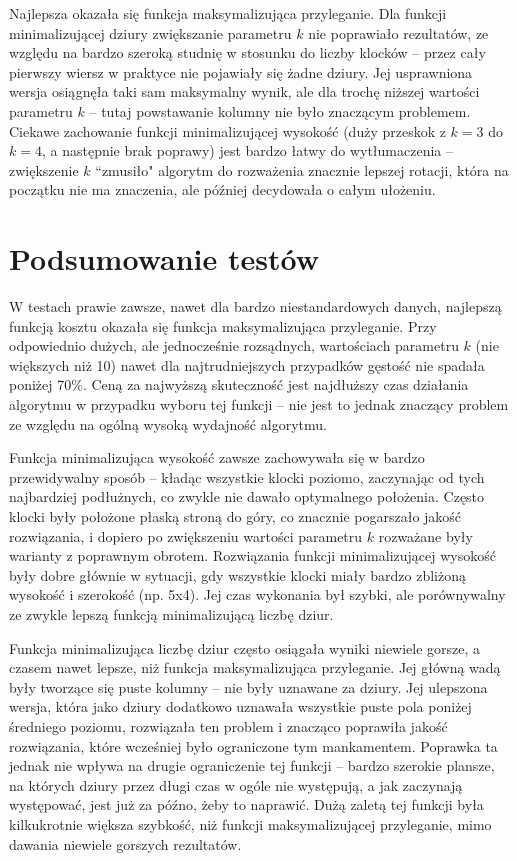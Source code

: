 \documentclass{article}
\begin{document}
Najlepsza okazała się funkcja maksymalizująca przyleganie. Dla funkcji minimalizującej dziury zwiększanie parametru $k$ nie poprawiało rezultatów, ze względu na bardzo szeroką studnię w stosunku do liczby klocków -- przez cały pierwszy wiersz w praktyce nie pojawiały się żadne dziury. Jej usprawniona wersja osiągnęła taki sam maksymalny wynik, ale dla trochę niższej wartości parametru $k$ -- tutaj powstawanie kolumny nie było znaczącym problemem.
Ciekawe zachowanie funkcji minimalizującej wysokość (duży przeskok z $k=3$ do $k=4$, a następnie brak poprawy) jest bardzo łatwy do wytłumaczenia -- zwiększenie $k$ ``zmusiło" algorytm do rozważenia znacznie lepszej rotacji, która na początku nie ma znaczenia, ale później decydowała o całym ułożeniu. 


\clearpage

\section{Podsumowanie testów} 
W testach prawie zawsze, nawet dla bardzo niestandardowych danych, najlepszą funkcją kosztu okazała się funkcja maksymalizująca przyleganie. Przy odpowiednio dużych, ale jednocześnie rozsądnych, wartościach parametru $k$ (nie większych niż 10) nawet dla najtrudniejszych przypadków gęstość nie spadała poniżej 70\%. Ceną za najwyższą skuteczność jest najdłuższy czas działania algorytmu w przypadku wyboru tej funkcji -- nie jest to jednak znaczący problem ze względu na ogólną wysoką wydajność algorytmu.

Funkcja minimalizująca wysokość zawsze zachowywała się w bardzo przewidywalny sposób -- kładąc wszystkie klocki poziomo, zaczynając od tych najbardziej podłużnych, co zwykle nie dawało optymalnego położenia. Często klocki były położone płaską stroną do góry, co znacznie pogarszało jakość rozwiązania, i dopiero po zwiększeniu wartości parametru $k$ rozważane były warianty z poprawnym obrotem. Rozwiązania funkcji minimalizującej wysokość były dobre głównie w sytuacji, gdy wszystkie klocki miały bardzo zbliżoną wysokość i szerokość (np. 5x4). Jej czas wykonania był szybki, ale porównywalny ze zwykle lepszą funkcją minimalizującą liczbę dziur.

Funkcja minimalizująca liczbę dziur często osiągała wyniki niewiele gorsze, a czasem nawet lepsze, niż funkcja maksymalizująca przyleganie. Jej główną wadą były tworzące się puste kolumny -- nie były uznawane za dziury. Jej ulepszona wersja, która jako dziury dodatkowo uznawała wszystkie puste pola poniżej średniego poziomu, rozwiązała ten problem i znacząco poprawiła jakość rozwiązania, które wcześniej było ograniczone tym mankamentem. Poprawka ta jednak nie wpływa na drugie ograniczenie tej funkcji -- bardzo szerokie plansze, na których dziury przez długi czas w ogóle nie występują, a jak zaczynają występować, jest już za późno, żeby to naprawić. Dużą zaletą tej funkcji była kilkukrotnie większa szybkość, niż funkcji maksymalizującej przyleganie, mimo dawania niewiele gorszych rezultatów.
\end{document}

